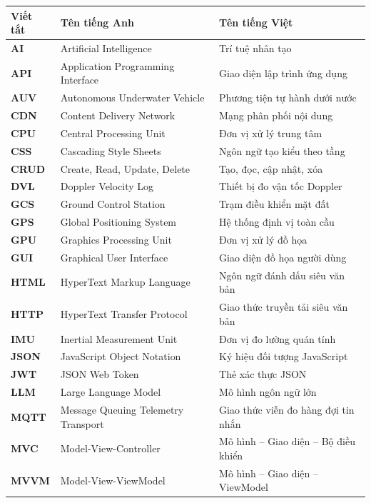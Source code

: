 \documentclass[../DoAn.tex]{subfiles}
\begin{document}
\begin{longtable}{l p{6.0cm} p{7.0cm}}
    \hline
    \textbf{Viết tắt} & \textbf{Tên tiếng Anh} & \textbf{Tên tiếng Việt} \\ \hline
    \textbf{AI}   & Artificial Intelligence & Trí tuệ nhân tạo \\
    \textbf{API}  & Application Programming Interface & Giao diện lập trình ứng dụng \\
    \textbf{AUV}  & Autonomous Underwater Vehicle & Phương tiện tự hành dưới nước \\
    \textbf{CDN}  & Content Delivery Network & Mạng phân phối nội dung \\
    \textbf{CPU}  & Central Processing Unit & Đơn vị xử lý trung tâm \\
    \textbf{CSS}  & Cascading Style Sheets & Ngôn ngữ tạo kiểu theo tầng \\
    \textbf{CRUD} & Create, Read, Update, Delete & Tạo, đọc, cập nhật, xóa \\
    \textbf{DVL}  & Doppler Velocity Log & Thiết bị đo vận tốc Doppler \\
    \textbf{GCS}  & Ground Control Station & Trạm điều khiển mặt đất \\
    \textbf{GPS}  & Global Positioning System & Hệ thống định vị toàn cầu \\
    \textbf{GPU}  & Graphics Processing Unit & Đơn vị xử lý đồ họa \\
    \textbf{GUI}  & Graphical User Interface & Giao diện đồ họa người dùng \\
    \textbf{HTML} & HyperText Markup Language & Ngôn ngữ đánh dấu siêu văn bản \\
    \textbf{HTTP} & HyperText Transfer Protocol & Giao thức truyền tải siêu văn bản \\
    \textbf{IMU}  & Inertial Measurement Unit & Đơn vị đo lường quán tính \\
    \textbf{JSON} & JavaScript Object Notation & Ký hiệu đối tượng JavaScript \\
    \textbf{JWT}  & JSON Web Token & Thẻ xác thực JSON \\
    \textbf{LLM}  & Large Language Model & Mô hình ngôn ngữ lớn \\
    \textbf{MQTT} & Message Queuing Telemetry Transport & Giao thức viễn đo hàng đợi tin nhắn \\
    \textbf{MVC}  & Model-View-Controller & Mô hình -- Giao diện -- Bộ điều khiển \\
    \textbf{MVVM} & Model-View-ViewModel & Mô hình -- Giao diện -- ViewModel \\

\end{longtable}
\end{document}
